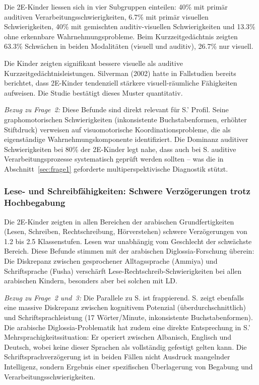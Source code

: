 \documentclass[ngerman, a4paper]{article}
\begin{document}
Die 2E-Kinder liessen sich in vier Subgruppen einteilen: 40\% mit primär
auditiven Verarbeitungsschwierigkeiten, 6.7\% mit primär visuellen
Schwierigkeiten, 40\% mit gemischten auditiv-visuellen Schwierigkeiten und
13.3\% ohne erkennbare Wahrnehmungsprobleme. Beim Kurzzeitgedächtnis
zeigten 63.3\% Schwächen in beiden Modalitäten (visuell und auditiv),
26.7\% nur visuell.

Die Kinder zeigten signifikant bessere visuelle als auditive
Kurzzeitgedächtnisleistungen. Silverman (2002) hatte in Fallstudien
bereits berichtet, dass 2E-Kinder tendenziell stärkere visuell-räumliche
Fähigkeiten aufweisen. Die Studie bestätigt dieses Muster quantitativ.

\textit{Bezug zu Frage~2:} Diese Befunde sind direkt relevant für S.'
Profil. Seine graphomotorischen Schwierigkeiten (inkonsistente
Buchstabenformen, erhöhter Stiftdruck) verweisen auf visuomotorische
Koordinationsprobleme, die \textcite[S.\,5--6]{alhroub2021utility} als eigenständige
Wahrnehmungskomponente identifiziert. Die Dominanz auditiver
Schwierigkeiten bei 80\% der 2E-Kinder legt nahe, dass auch bei S.
auditive Verarbeitungsprozesse systematisch geprüft werden sollten -- was
die in Abschnitt~\ref{sec:frage1} geforderte multiperspektivische
Diagnostik stützt.

\subsubsection*{Lese- und Schreibfähigkeiten: Schwere Verzögerungen trotz
  Hochbegabung}

Die 2E-Kinder zeigten in allen Bereichen der arabischen Grundfertigkeiten
(Lesen, Schreiben, Rechtschreibung, Hörverstehen) schwere Verzögerungen
von 1.2 bis 2.5 Klassenstufen. Lesen war unabhängig vom Geschlecht der
schwächste Bereich. Diese Befunde stimmen mit der arabischen
Diglossia-Forschung überein: Die Diskrepanz zwischen gesprochener
Alltagssprache (Ammiya) und Schriftsprache (Fusha) verschärft
Lese-Rechtschreib-Schwierigkeiten bei allen arabischen Kindern, besonders
aber bei solchen mit LD.

\textit{Bezug zu Frage~2 und~3:} Die Parallele zu S. ist frappierend. S.
zeigt ebenfalls eine massive Diskrepanz zwischen kognitivem Potenzial
(überdurchschnittlich) und Schriftsprachleistung (17 Wörter/Minute,
inkonsistente Buchstabenformen). Die arabische Diglossia-Problematik hat
zudem eine direkte Entsprechung in S.' Mehrsprachigkeitssituation: Er
operiert zwischen Albanisch, Englisch und Deutsch, wobei keine dieser
Sprachen als vollständig gefestigt gelten kann. Die
Schriftsprachverzögerung ist in beiden Fällen nicht Ausdruck mangelnder
Intelligenz, sondern Ergebnis einer spezifischen Überlagerung von Begabung
und Verarbeitungsschwierigkeiten.
\end{document}
